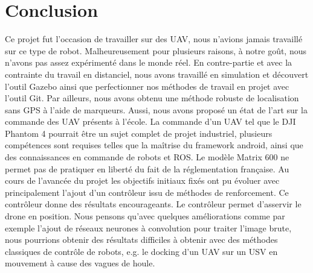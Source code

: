 \section{Conclusion}

Ce projet fut l’occasion de travailler sur des UAV, 
nous n'avions jamais travaillé sur ce type de robot. 
Malheureusement pour plusieurs raisons, à notre goût, 
nous n’avons pas assez expérimenté dans le monde réel. 
En contre-partie et avec la contrainte du travail en distanciel, 
nous avons travaillé en simulation et découvert l’outil Gazebo ainsi que perfectionner 
nos méthodes de travail en projet avec l’outil Git. 
Par ailleurs, nous avons obtenu une méthode robuste de localisation sans GPS 
à l’aide de marqueurs. Aussi, nous avons proposé un état de l’art sur la commande des UAV présents à l’école. La commande d’un UAV tel que le DJI Phantom 4 pourrait être un sujet complet de projet industriel, plusieurs compétences sont requises telles que la maîtrise du framework android, ainsi que des connaissances en commande de robots et ROS. Le modèle Matrix 600 ne permet pas de pratiquer en liberté du fait de la réglementation française. Au cours de l’avancée du projet les objectifs initiaux fixés ont pu évoluer avec principalement l’ajout d’un contrôleur issu de méthodes de renforcement. Ce contrôleur donne des résultats encourageants. Le contrôleur permet d’asservir le drone en position. Nous pensons qu’avec quelques améliorations comme par exemple l’ajout de réseaux neurones à  convolution pour traiter l’image brute, nous pourrions obtenir des résultats difficiles à obtenir avec des méthodes classiques de contrôle de robots, e.g. le docking d’un UAV sur un USV en mouvement à cause des vagues de houle. 